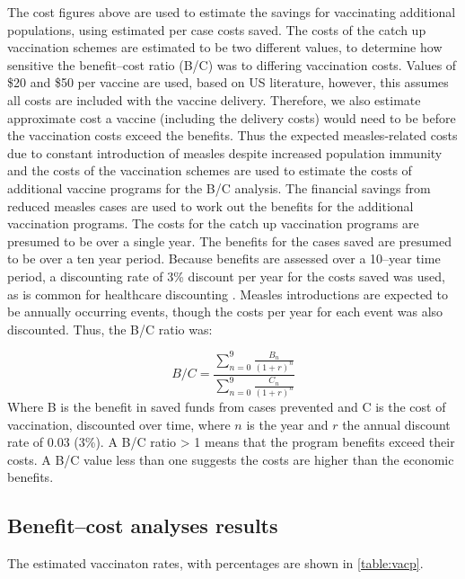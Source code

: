 \documentclass{article}
\begin{document}
The cost figures above are used to estimate the savings for vaccinating additional populations, using estimated per case costs saved. The costs of the catch up vaccination schemes are estimated to be two different values, to determine how sensitive the benefit--cost ratio (B/C) was to differing vaccination costs. Values of \$20 and \$50 per vaccine are used, based on US literature, however, this assumes all costs are included with the vaccine delivery. Therefore, we also estimate approximate cost a vaccine (including the delivery costs) would need to be before the vaccination costs exceed the benefits. Thus the expected measles-related costs due to constant introduction of measles despite increased population immunity and the costs of the vaccination schemes are used to estimate the costs of additional vaccine programs for the B/C analysis. The financial savings from reduced measles cases are used to work out the benefits for the additional vaccination programs. The costs for the catch up vaccination programs are presumed to be over a single year. The benefits for the cases saved are presumed to be over a ten year period. Because benefits are assessed over a 10--year time period, a discounting rate of 3\% discount per year for the costs saved was used, as is common for healthcare discounting \citep{honeycutt6}. Measles introductions are expected to be annually occurring events, though the costs per year for each event was also discounted. Thus, the B/C ratio was:

\begin{equation} \label{eq:bc}
 \textit{B/C} = \frac{\sum\limits_{n=0}^{9} \frac{B_n}{(1+r)^n}}{\sum\limits_{n=0}^{9} \frac{C_n}{(1+r)^n}}
 \end{equation}
Where B is the benefit in saved funds from cases prevented and C is the cost of vaccination, discounted over time, where $n$ is the year and $r$ the annual discount rate of 0.03 (3\%).
A B/C ratio > 1 means that the program benefits exceed their costs. A B/C value less than one suggests the costs are higher than the economic benefits.

\subsection{Benefit--cost analyses results}

The estimated vaccinaton rates, with percentages are shown in \autoref{table:vacp}.
\end{document}
